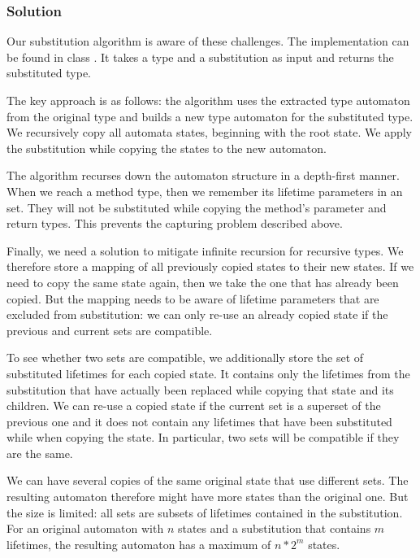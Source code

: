 \subsubsection{Solution}
Our substitution algorithm is aware of these challenges.
The implementation can be found in class .
It takes a type and a substitution as input and returns the substituted type.

The key approach is as follows:
the algorithm uses the extracted type automaton from the original type and builds a new type automaton for the substituted type.
We recursively copy all automata states, beginning with the root state.
We apply the substitution while copying the states to the new automaton.

The algorithm recurses down the automaton structure in a depth-first manner.
When we reach a method type, then we remember its lifetime parameters in an  set.
They will not be substituted while copying the method's parameter and return types.
This prevents the capturing problem described above.

Finally, we need a solution to mitigate infinite recursion for recursive types.
We therefore store a mapping of all previously copied states to their new states.
If we need to copy the same state again, then we take the one that has already been copied.
But the mapping needs to be aware of lifetime parameters that are excluded from substitution:
we can only re-use an already copied state if the previous and current  sets are compatible.

To see whether two  sets are compatible, we additionally store the set of substituted lifetimes for each copied state.
It contains only the lifetimes from the substitution that have actually been replaced while copying that state and its children.
We can re-use a copied state if the current  set is a superset of the previous one and it does not contain any lifetimes that have been substituted while when copying the state.
In particular, two  sets will be compatible if they are the same.

We can have several copies of the same original state that use different  sets.
The resulting automaton therefore might have more states than the original one.
But the size is limited:
all  sets are subsets of lifetimes contained in the substitution.
For an original automaton with $n$ states and a substitution that contains $m$ lifetimes, the resulting automaton has a maximum of $n * 2^m$ states.


